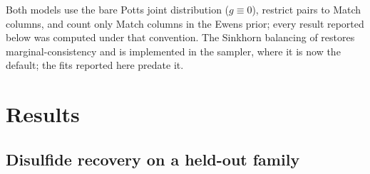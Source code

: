 \documentclass[11pt]{article}
\begin{document}
Both models use the bare Potts joint distribution ($g\equiv0$), restrict pairs
to Match columns, and count only Match columns in the Ewens prior; every result
reported below was computed under that convention. The Sinkhorn balancing of
 restores marginal-consistency and is implemented in the
sampler, where it is now the default; the fits reported here predate it.

\section{Results}
\label{sec:results}

\subsection{Disulfide recovery on a held-out family}
\label{sec:pf00053}
\end{document}
